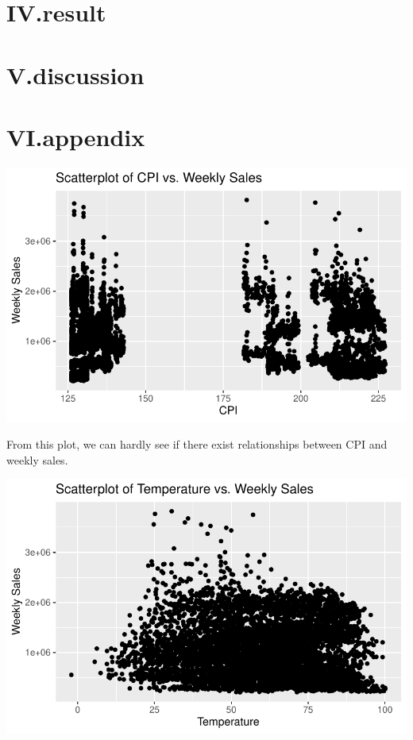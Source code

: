 \documentclass[
  letterpaper,
  DIV=11,
  numbers=noendperiod]{scrartcl}
\begin{document}
\hypertarget{iv.result}{%
\section{IV.result}\label{iv.result}}

\hypertarget{v.discussion}{%
\section{V.discussion}\label{v.discussion}}

\hypertarget{vi.appendix}{%
\section{VI.appendix}\label{vi.appendix}}

\includegraphics{678final_files/figure-pdf/unnamed-chunk-13-1.pdf}

From this plot, we can hardly see if there exist relationships between
CPI and weekly sales.

\includegraphics{678final_files/figure-pdf/unnamed-chunk-14-1.pdf}
\end{document}
